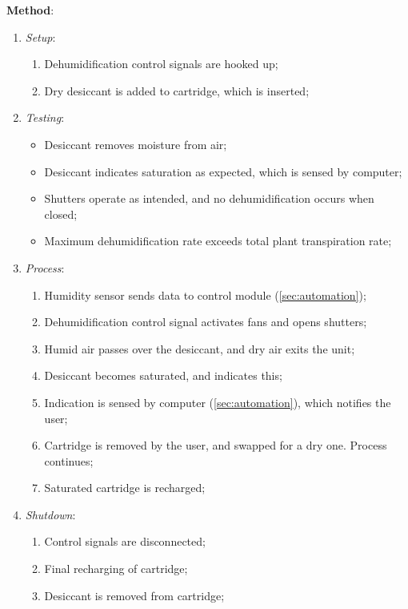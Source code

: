\documentclass{report}
\begin{document}
\textbf{Method}:
\begin{enumerate}
    \item \textit{Setup}:
    \begin{enumerate}
        \item Dehumidification control signals are hooked up;
        \item Dry desiccant is added to cartridge, which is inserted;
    \end{enumerate}
    \item \textit{Testing}:
    \begin{itemize}
        \item Desiccant removes moisture from air;
        \item Desiccant indicates saturation as expected, which is sensed by computer;
        \item Shutters operate as intended, and no dehumidification occurs when closed;
        \item Maximum dehumidification rate exceeds total plant transpiration rate;
    \end{itemize}
    \item \textit{Process}:
    \begin{enumerate}
        \item Humidity sensor sends data to control module (\ref{sec:automation});
        \item Dehumidification control signal activates fans and opens shutters;
        \item Humid air passes over the desiccant, and dry air exits the unit;
        \item Desiccant becomes saturated, and indicates this;
        \item Indication is sensed by computer (\ref{sec:automation}), which notifies the user;
        \item Cartridge is removed by the user, and swapped for a dry one. Process continues;
        \item Saturated cartridge is recharged;
    \end{enumerate}
    \item \textit{Shutdown}:
    \begin{enumerate}
        \item Control signals are disconnected;
        \item Final recharging of cartridge;
        \item Desiccant is removed from cartridge;
    \end{enumerate}
\end{enumerate}
\end{document}
